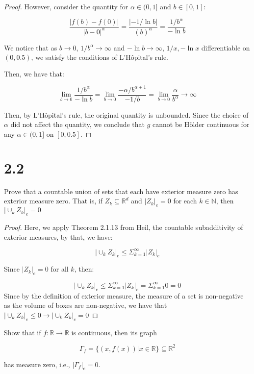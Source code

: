 \documentclass[10pt]{article}
\newenvironment{problem}[2][Problem]{\begin{trivlist}
\item[\hskip \labelsep {\bfseries #1}\hskip \labelsep {\bfseries #2.}]}{\end{trivlist}}
\begin{document}
\begin{proof}[Proof]
However, consider the quantity for $\alpha \in (0,1]$ and $b \in [0,1]$:

$$ \frac{|f(b) - f(0)|}{|b-0|^{\alpha}} = \frac{|-1/\ln b|}{(b)^{\alpha}} =  \frac{1/b^{\alpha}}{-\ln b}$$

We notice that as $b \rightarrow 0$, $1/b^{\alpha} \rightarrow \infty$ and $-\ln b \rightarrow \infty$, $1/x, -\ln x$ differentiable on $(0,0.5)$, we satisfy the conditions of L'H\^{o}pital's rule.

Then, we have that:

$$ \lim_{b \rightarrow 0} \frac{1/b^{\alpha}}{-\ln b} =  \lim_{b \rightarrow 0} \frac{-\alpha/b^{\alpha + 1}}{-1/b} = \lim_{b \rightarrow 0} \frac{\alpha}{b^{\alpha}} \rightarrow \infty $$

Then, by  L'H\^{o}pital's rule, the original quantity is unbounded. Since the choice of $\alpha$ did not affect the quantity, we conclude that $g$ cannot be  H\"{o}lder continuous for any $\alpha \in (0,1]$ on $[0,0.5]$.

\end{proof}

\section*{2.2}

\begin{problem}{2.1.29}
Prove that a countable union of sets that each have exterior measure zero has exterior measure zero. That is, if $Z_k \subseteq \mathbb{R}^d$ and $|Z_k|_e = 0$ for each $k \in \mathbb{N}$, then $|\cup_k Z_k|_e = 0$
\end{problem}

\begin{proof}[Proof]
Here, we apply Theorem 2.1.13 from Heil, the countable subadditivity of exterior measures, by that, we have:

$$ |\cup_k Z_k|_e \leq \Sigma_{k=1}^{\infty} |Z_k|_e$$

Since $|Z_k|_e = 0$ for all $k$, then:

$$ |\cup_k Z_k|_e \leq \Sigma_{k=1}^{\infty} |Z_k|_e = \Sigma_{k=1}^{\infty} 0 = 0 $$ Since by the definition of exterior measure, the measure of a set is non-negative as the volume of boxes are non-negative, we have that $|\cup_k Z_k|_e \leq 0 \rightarrow |\cup_k Z_k|_e = 0$
\end{proof}

\begin{problem}{2.1.32}
Show that if $f: \mathbb{R} \rightarrow \mathbb{R}$ is continuous, then its graph

$$ \Gamma_f = \{ (x, f(x)) | x \in \mathbb{R}\} \subseteq \mathbb{R}^2$$

has measure zero, i.e., $|\Gamma_f|_e = 0$.
\end{problem}
\end{document}
